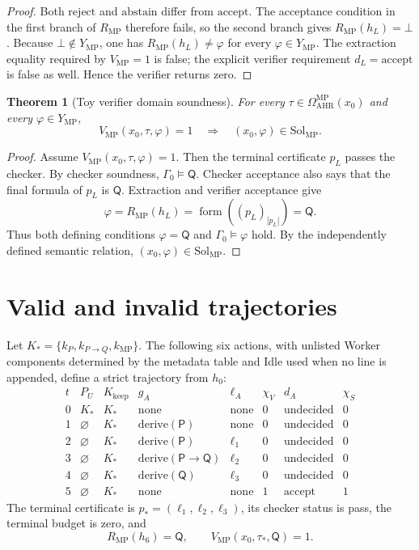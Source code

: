 \documentclass[11pt,oneside]{book}
\newtheorem{theorem}[definition]{Theorem}
\theoremstyle{remark}
\newcommand{\Sol}{\mathrm{Sol}}
\newcommand{\Om}{\Omega}
\begin{document}
\begin{proof}
Both $\mathrm{reject}$ and $\mathrm{abstain}$ differ from
$\mathrm{accept}$. The acceptance condition in the first branch of
$R_{\mathrm{MP}}$ therefore fails, so the second branch gives
$R_{\mathrm{MP}}(h_L)=\bot$. Because $\bot\notin Y_{\mathrm{MP}}$, one has
$R_{\mathrm{MP}}(h_L)\ne\varphi$ for every
$\varphi\in Y_{\mathrm{MP}}$. The extraction equality required by
$V_{\mathrm{MP}}=1$ is false; the explicit verifier requirement
$d_L=\mathrm{accept}$ is false as well. Hence the verifier returns zero.
\end{proof}

\begin{theorem}[Toy verifier domain soundness]
For every
$\tau\in\Om_{\mathrm{AHR}}^{\mathrm{MP}}(x_0)$ and every
$\varphi\in Y_{\mathrm{MP}}$,
\[
V_{\mathrm{MP}}(x_0,\tau,\varphi)=1
\quad\Longrightarrow\quad
(x_0,\varphi)\in\Sol_{\mathrm{MP}}.
\]
\end{theorem}

\begin{proof}
Assume $V_{\mathrm{MP}}(x_0,\tau,\varphi)=1$. Then the terminal certificate
$p_L$ passes the checker. By checker soundness,
$\Gamma_0\models\mathsf Q$. Checker acceptance also says that the final
formula of $p_L$ is $\mathsf Q$. Extraction and verifier acceptance give
\[
\varphi=R_{\mathrm{MP}}(h_L)
=\operatorname{form}((p_L)_{|p_L|})
=\mathsf Q.
\]
Thus both defining conditions
$\varphi=\mathsf Q$ and $\Gamma_0\models\varphi$ hold. By the independently
defined semantic relation, $(x_0,\varphi)\in\Sol_{\mathrm{MP}}$.
\end{proof}

\section{Valid and invalid trajectories}

Let
$K_*=\{k_P,k_{P\to Q},k_{\mathrm{MP}}\}$. The following six actions, with
unlisted Worker components determined by the metadata table and Idle used
when no line is appended, define a strict trajectory from $h_0$:
\[
\begin{array}{c|c|c|c|c|c|c|c}
t&P_U&K_{\mathrm{keep}}&g_A&\ell_A&\chi_V&d_A&\chi_S\\
\hline
0&K_*&K_*&\mathrm{none}&\mathrm{none}&0&\mathrm{undecided}&0\\
1&\varnothing&K_*&\mathrm{derive}(\mathsf P)&\mathrm{none}
&0&\mathrm{undecided}&0\\
2&\varnothing&K_*&\mathrm{derive}(\mathsf P)&\ell_1
&0&\mathrm{undecided}&0\\
3&\varnothing&K_*&\mathrm{derive}(\mathsf P\to\mathsf Q)&\ell_2
&0&\mathrm{undecided}&0\\
4&\varnothing&K_*&\mathrm{derive}(\mathsf Q)&\ell_3
&0&\mathrm{undecided}&0\\
5&\varnothing&K_*&\mathrm{none}&\mathrm{none}
&1&\mathrm{accept}&1
\end{array}
\]
The terminal certificate is
$p_*=(\ell_1,\ell_2,\ell_3)$, its checker status is pass, the terminal budget
is zero, and
\[
R_{\mathrm{MP}}(h_6)=\mathsf Q,
\qquad
V_{\mathrm{MP}}(x_0,\tau_*,\mathsf Q)=1.
\]
\end{document}
